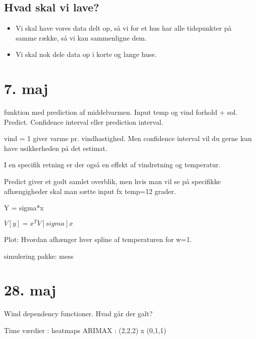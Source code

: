 \subsection{Hvad skal vi lave?}
\begin{itemize}
    \item Vi skal have vores data delt op, så vi for et hus har alle tidspunkter på samme række, så vi kan sammenligne dem.
    \item Vi skal nok dele data op i korte og lange huse.  
\end{itemize}


\section{7. maj}

funktion med prediction af middelvarmen. Input temp og vind forhold + sol.
Predict. Confidence interval eller prediction interval.

vind = 1 giver varme pr. vindhastighed. Men confidence interval vil du gerne kun have usikkerheden på det estimat.

I en specifik retning er der også en effekt af vindretning og temperatur.


Predict giver et godt samlet overblik, men hvis man vil se på specifikke afhængigheder skal man sætte input fx temp=12 grader.


Y = sigma*x

$V[y] = x^T V[sigma] x$


Plot: Hvordan afhænger hver spline af temperaturen for w=1.



simulering pakke:
mess


\section{28. maj}
Wind dependency functioner. Hvad går der galt?

Time værdier : heatmaps
ARIMAX : (2,2,2) x (0,1,1)
